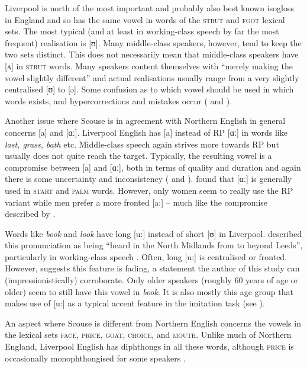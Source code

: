 Liverpool is north of the most important and probably also best known isogloss in England and so has the same vowel in words of the \textsc{strut} and \textsc{foot} lexical sets.
The most typical (and at least in working-class speech by far the most frequent) realisation is [ʊ].
Many middle-class speakers, however, tend to keep the two sets distinct.
This does not necessarily mean that middle-class speakers have [ʌ] in \textsc{strut} words.
Many speakers content themselves with ``merely making the vowel slightly different'' \citep[284]{knowles1973} and actual realisations usually range from a very slightly centralised [ʊ] to [ə].
Some confusion as to which vowel should be used in which words exists, and hypercorrections and mistakes occur (\citealt[286--287]{knowles1973} and \citealt[83]{knowles1978}).

Another issue where Scouse is in agreement with Northern English in general concerns [a] and [ɑː].
Liverpool English has [a] instead of RP [ɑː] in words like \emph{last, grass, bath} etc.
Middle-class speech again strives more towards RP but usually does not quite reach the target.
Typically, the resulting vowel is a compromise between [a] and [ɑː], both in terms of quality and duration and again there is some uncertainty and inconsistency (\citealp[cf.][287--289]{knowles1973} and \citeyear[83--84]{knowles1978}).
\citeauthor{watson2007} found that [ɑː] is generally used in \textsc{start} and \textsc{palm} words.
However, only women seem to really use the RP variant while men prefer a more fronted [a:] \parencite[cf.][358]{watson2007} -- much like the compromise described by \cite{knowles1973}.

Words like \emph{book} and \emph{look} have long [u:] instead of short [ʊ] in Liverpool.
\citet{knowles1973} described this pronunciation as being ``heard in the North Midlands from  to beyond Leeds'', particularly in working-class speech \citep[290]{knowles1973}.
Often, long [u:] is centralised or fronted.
However, \citet[358]{watson2007} suggests this feature is fading, a statement the author of this study can (impressionistically) corroborate.
Only older speakers (roughly 60 years of age or older) seem to still have this vowel in \emph{book}.
It is also mostly this age group that makes use of [u:] as a typical accent feature in the imitation task (see ).

An aspect where Scouse is different from Northern English concerns the vowels in the lexical sets \textsc{face}, \textsc{price}, \textsc{goat}, \textsc{choice}, and \textsc{mouth}.
Unlike much of Northern England, Liverpool English has diphthongs in all these words, although \textsc{price} is occasionally monophthongised for some speakers \citep[cf.][358]{watson2007}.

